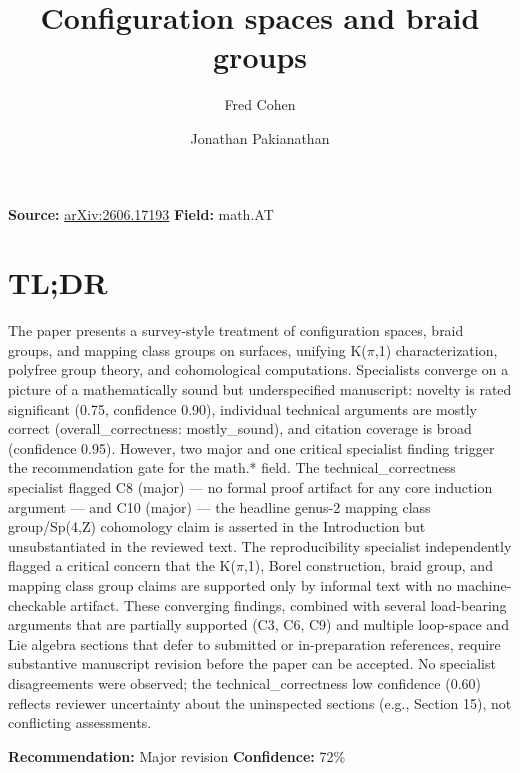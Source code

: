\documentclass[11pt]{article}
\title{Configuration spaces and braid groups}
\author{Fred Cohen \and Jonathan Pakianathan}
\date{}
\begin{document}
\maketitle

\noindent\textbf{Source:} \href{https://arxiv.org/abs/2606.17193}{arXiv:2606.17193} \quad \textbf{Field:} math.AT\\

\section*{TL;DR}
The paper presents a survey-style treatment of configuration spaces, braid groups, and mapping class groups on surfaces, unifying K(\ensuremath{\pi},1) characterization, polyfree group theory, and cohomological computations. Specialists converge on a picture of a mathematically sound but underspecified manuscript: novelty is rated significant (0.75, confidence 0.90), individual technical arguments are mostly correct (overall\_correctness: mostly\_sound), and citation coverage is broad (confidence 0.95). However, two major and one critical specialist finding trigger the recommendation gate for the math.* field. The technical\_correctness specialist flagged C8 (major) --- no formal proof artifact for any core induction argument --- and C10 (major) --- the headline genus-2 mapping class group/Sp(4,Z) cohomology claim is asserted in the Introduction but unsubstantiated in the reviewed text. The reproducibility specialist independently flagged a critical concern that the K(\ensuremath{\pi},1), Borel construction, braid group, and mapping class group claims are supported only by informal text with no machine-checkable artifact. These converging findings, combined with several load-bearing arguments that are partially supported (C3, C6, C9) and multiple loop-space and Lie algebra sections that defer to submitted or in-preparation references, require substantive manuscript revision before the paper can be accepted. No specialist disagreements were observed; the technical\_correctness low confidence (0.60) reflects reviewer uncertainty about the uninspected sections (e.g., Section 15), not conflicting assessments.

\textbf{Recommendation:} Major revision \quad \textbf{Confidence:} 72\%\\
\end{document}
